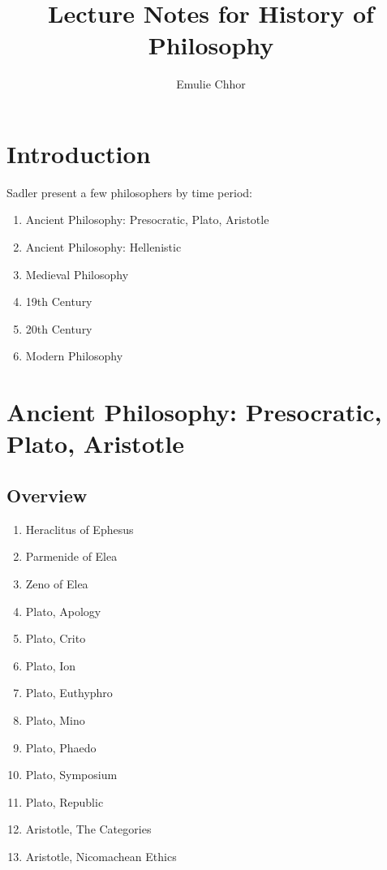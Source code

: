 \documentclass{article}
\begin{document}
\title{Lecture Notes for History of Philosophy}
\author{Emulie Chhor}
\maketitle

\section*{Introduction}

Sadler present a few philosophers by time period:
\begin{enumerate}
    \item Ancient Philosophy: Presocratic, Plato, Aristotle
    \item Ancient Philosophy: Hellenistic
    \item Medieval Philosophy
    \item 19th Century
    \item 20th Century
    \item Modern Philosophy
\end{enumerate}

\section{Ancient Philosophy: Presocratic, Plato, Aristotle}

\subsection{Overview}%
\label{sub:Overview}

\begin{enumerate}
    \item Heraclitus of Ephesus
    \item Parmenide of Elea
    \item Zeno of Elea
    \item Plato, Apology
    \item Plato, Crito
    \item Plato, Ion
    \item Plato, Euthyphro
    \item Plato, Mino
    \item Plato, Phaedo
    \item Plato, Symposium
    \item Plato, Republic
    \item Aristotle, The Categories
    \item Aristotle, Nicomachean Ethics
\end{enumerate}
\end{document}
